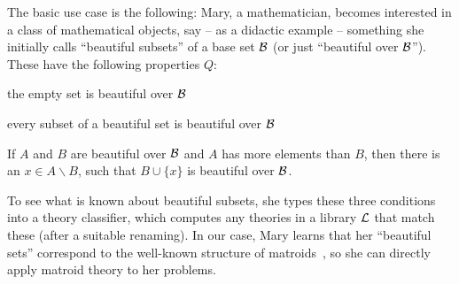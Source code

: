 
The basic use case is the following: Mary, a mathematician, becomes interested in a class
of mathematical objects, say -- as a didactic example -- something she initially calls
``beautiful subsets'' of a base set $\mathcal{B}$ (or just ``beautiful over $\mathcal{B}$''). These have
the following properties $Q$:
\begin{compactenum}
\item the empty set is beautiful over $\mathcal{B}$
\item every subset of a beautiful set is beautiful over $\mathcal{B}$
\item If $A$ and $B$ are beautiful over $\mathcal{B}$ and $A$ has more elements than $B$, then
  there is an $x\in A\backslash B$, such that $B\cup\{x\}$ is beautiful over $\mathcal{B}$.
\end{compactenum}
To see what is known about beautiful subsets, she types these three conditions into a theory
classifier, which computes any theories in a library $\mathcal{L}$ that match these (after a
suitable renaming).  In our case, Mary learns that her ``beautiful sets'' correspond to
the well-known structure of matroids~\cite{wikipedia:matroid}, so she can directly apply
matroid theory to her problems.

